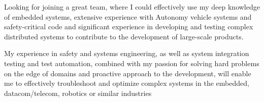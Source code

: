 


\begin{cventries}


\begin{flushleft}

Looking for joining a great team, where I could effectively use my deep knowledge of embedded systems,
extensive experience with Autonomy vehicle systems and safety-critical code and significant experience in
developing and testing complex distributed systems to contribute to the development of large-scale products.


My experience in safety and systems engineering, as well as system integration testing and test automation, 
combined with my passion for solving hard problems on the edge of domains and proactive approach to the development, 
will enable me to effectively troubleshoot and optimize complex systems in the embedded, datacom/telecom, 
robotics or similar industries

\end{flushleft}


\end{cventries}